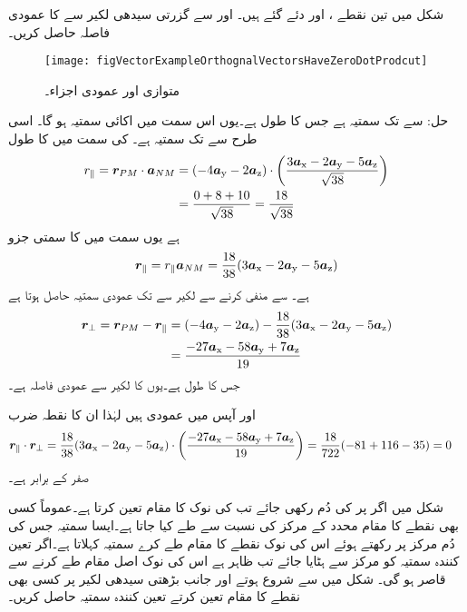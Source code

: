 شکل  میں تین نقطے ،  اور  دئے گئے ہیں۔  اور  سے گزرتی سیدھی لکیر سے  کا عمودی فاصلہ حاصل کریں۔
\begin{figure}
\centering
\texttt{[image: figVectorExampleOrthognalVectorsHaveZeroDotProdcut]}
\caption{متوازی اور عمودی اجزاء۔}
\label{شکل_سمتیہ_مثال_عمودی_سمتیات_کا_نقطہ_ضرب_صفر}
\end{figure}

حل: سے  تک سمتیہ  ہے جس کا طول  ہے۔یوں اس سمت میں اکائی سمتیہ  ہو گا۔ اسی طرح  سے  تک سمتیہ  ہے۔ کی سمت میں  کا طول
\begin{align*}
r_{\parallel}={{\boldsymbol{r}}}_{PM} \cdot {\ensuremath{{\boldsymbol{a}}}}_{NM}&=(-4{\boldsymbol{a}}_{\textup{y}}-2{\boldsymbol{a}}_{\textup{z}}) \cdot \left(\frac{3{\boldsymbol{a}}_{\textup{x}}-2{\boldsymbol{a}}_{\textup{y}}-5{\boldsymbol{a}}_{\textup{z}}}{\sqrt{38}}\right) \\
&=\frac{0+8+10}{\sqrt{38}}=\frac{18}{\sqrt{38}}
\end{align*}
ہے یوں  سمت میں  کا سمتی جزو
\begin{align*}
{\ensuremath{{\boldsymbol{r}}}}_{\parallel}=r_{\parallel} {{\boldsymbol{a}}}_{NM}=\frac{18}{38} (3{\boldsymbol{a}}_{\textup{x}}-2{\boldsymbol{a}}_{\textup{y}}-5{\boldsymbol{a}}_{\textup{z}})
\end{align*}
ہے۔ سے  منفی کرنے سے لکیر سے  تک عمودی سمتیہ  حاصل ہوتا ہے
\begin{align*}
{\ensuremath{{\boldsymbol{r}}}}_{\perp}={{\boldsymbol{r}}}_{PM}-{{\boldsymbol{r}}}_{\parallel}&=(-4{\boldsymbol{a}}_{\textup{y}}-2{\boldsymbol{a}}_{\textup{z}})-\frac{18}{38} (3{\boldsymbol{a}}_{\textup{x}}-2{\boldsymbol{a}}_{\textup{y}}-5{\boldsymbol{a}}_{\textup{z}})\\
&=\frac{-27{\boldsymbol{a}}_{\textup{x}}-58{\boldsymbol{a}}_{\textup{y}}+7{\boldsymbol{a}}_{\textup{z}}}{19}
\end{align*}
جس کا طول  ہے۔یوں  کا لکیر سے عمودی فاصلہ  ہے۔

 اور  آپس میں عمودی ہیں لہٰذا ان  کا نقطہ ضرب
\begin{align*}
{\ensuremath{{\boldsymbol{r}}}}_\parallel \cdot {\ensuremath{{\boldsymbol{r}}}}_\perp&=\frac{18}{38} (3{\boldsymbol{a}}_{\textup{x}}-2{\boldsymbol{a}}_{\textup{y}}-5{\boldsymbol{a}}_{\textup{z}}) \cdot \left(\frac{-27{\boldsymbol{a}}_{\textup{x}}-58{\boldsymbol{a}}_{\textup{y}}+7{\boldsymbol{a}}_{\textup{z}}}{19}\right)=\frac{18}{722}(-81+116-35)=0
\end{align*}
صفر کے برابر ہے۔

شکل  میں اگر  پر  کی دُم رکھی جائے تب   کی نوک  کا مقام تعین کرتا ہے۔عموماً کسی بھی نقطے کا مقام محدد کے مرکز  کی نسبت سے طے کیا جاتا ہے۔ایسا سمتیہ جس کی دُم مرکز پر رکھتے ہوئے اس کی نوک نقطے کا مقام طے کرے   سمتیہ کہلاتا ہے۔اگر تعین کنندہ سمتیہ کو مرکز سے ہٹایا جائے تب ظاہر ہے اس کی نوک اصل مقام طے کرنے سے قاصر ہو گی۔
شکل  میں  سے شروع ہوتے اور   جانب بڑھتی سیدھی لکیر پر کسی بھی نقطے کا مقام تعین کرتے تعین کنندہ سمتیہ حاصل کریں۔

